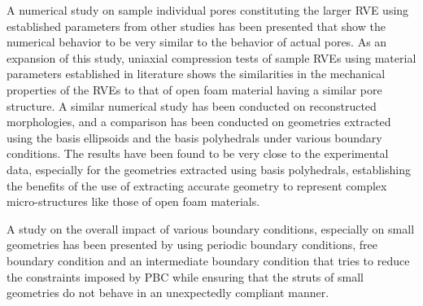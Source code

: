 A numerical study on sample individual pores constituting the larger RVE using established parameters from other studies has been presented that show the numerical behavior to be very similar to the behavior of actual pores. As an expansion of this study, uniaxial compression tests of sample RVEs using material parameters established in literature shows the similarities in the mechanical properties of the RVEs to that of open foam material having a similar pore structure. A similar numerical study has been conducted on reconstructed morphologies, and a comparison has been conducted on geometries extracted using the basis ellipsoids and the basis polyhedrals under various boundary conditions. The results have been found to be very close to the experimental data, especially for the geometries extracted using basis polyhedrals, establishing the benefits of the use of extracting accurate geometry to represent complex micro-structures like those of open foam materials.

A study on the overall impact of various boundary conditions, especially on small geometries has been presented by using periodic boundary conditions, free boundary condition and an intermediate boundary condition that tries to reduce the constraints imposed by PBC while ensuring that the struts of small geometries do not behave in an unexpectedly compliant manner.